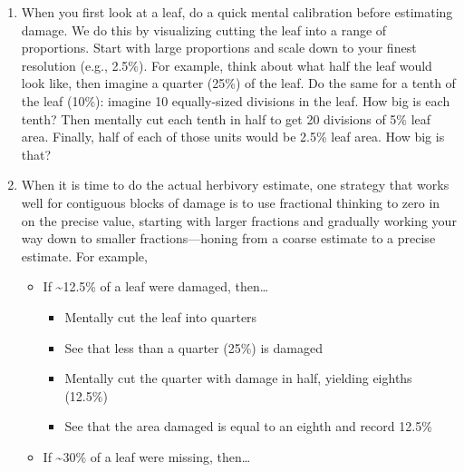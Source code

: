 \documentclass[
  letterpaper,
  DIV=11,
  numbers=noendperiod]{scrreprt}
\providecommand{\tightlist}{%
  \setlength{\itemsep}{0pt}\setlength{\parskip}{0pt}}\usepackage{longtable,booktabs,array}
\begin{document}
\begin{enumerate}
\def\labelenumi{\arabic{enumi}.}
\setcounter{enumi}{1}
\item
  When you first look at a leaf, do a quick mental calibration before
  estimating damage. We do this by visualizing cutting the leaf into a
  range of proportions. Start with large proportions and scale down to
  your finest resolution (e.g., 2.5\%). For example, think about what
  half the leaf would look like, then imagine a quarter (25\%) of the
  leaf. Do the same for a tenth of the leaf (10\%): imagine 10
  equally-sized divisions in the leaf. How big is each tenth? Then
  mentally cut each tenth in half to get 20 divisions of 5\% leaf area.
  Finally, half of each of those units would be 2.5\% leaf area. How big
  is that?
\item
  When it is time to do the actual herbivory estimate, one strategy that
  works well for contiguous blocks of damage is to use fractional
  thinking to zero in on the precise value, starting with larger
  fractions and gradually working your way down to smaller
  fractions---honing from a coarse estimate to a precise estimate. For
  example,

  \begin{itemize}
  \item
    If \textasciitilde12.5\% of a leaf were damaged, then\ldots{}

    \begin{itemize}
    \tightlist
    \item
      Mentally cut the leaf into quarters
    \item
      See that less than a quarter (25\%) is damaged
    \item
      Mentally cut the quarter with damage in half, yielding eighths
      (12.5\%)
    \item
      See that the area damaged is equal to an eighth and record 12.5\%
    \end{itemize}
  \item
    If \textasciitilde30\% of a leaf were missing, then\ldots{}


\end{itemize}
\end{enumerate}
\end{document}
